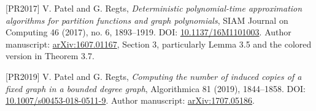 \documentclass[
  11pt,
  a4paper,
]{article}
\begin{document}
{[}PR2017{]} V. Patel and G. Regts, \emph{Deterministic polynomial-time
approximation algorithms for partition functions and graph polynomials},
SIAM Journal on Computing 46 (2017), no. 6, 1893--1919. DOI:
\href{https://doi.org/10.1137/16M1101003}{10.1137/16M1101003}. Author
manuscript: \href{https://arxiv.org/abs/1607.01167}{arXiv:1607.01167},
Section 3, particularly Lemma 3.5 and the colored version in Theorem
3.7.

{[}PR2019{]} V. Patel and G. Regts, \emph{Computing the number of
induced copies of a fixed graph in a bounded degree graph}, Algorithmica
81 (2019), 1844--1858. DOI:
\href{https://doi.org/10.1007/s00453-018-0511-9}{10.1007/s00453-018-0511-9}.
Author manuscript:
\href{https://arxiv.org/abs/1707.05186}{arXiv:1707.05186}.
\end{document}
